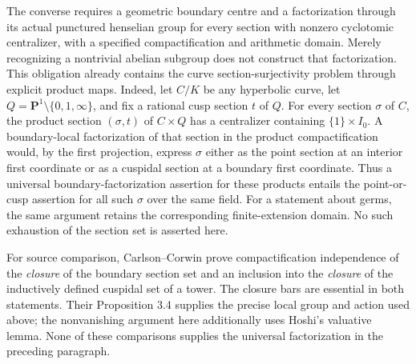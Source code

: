 The converse requires a geometric boundary centre and a factorization
through its actual punctured henselian group for every section with
nonzero cyclotomic centralizer, with a specified compactification and
arithmetic domain. Merely recognizing a nontrivial abelian subgroup
does not construct that factorization. This obligation already contains
the curve section-surjectivity problem through explicit product maps.
Indeed, let $C/K$ be any hyperbolic curve, let $Q=\mathbf
P^1\setminus\{0,1,\infty\}$, and fix a rational cusp section $t$ of
$Q$. For every section $\sigma$ of $C$, the product section
$(\sigma,t)$ of $C\times Q$ has a centralizer containing
$\{1\}\times I_0$. A boundary-local factorization of that section in
the product compactification would, by the first projection, express
$\sigma$ either as the point section at an interior first coordinate
or as a cuspidal section at a boundary first coordinate. Thus a
universal boundary-factorization assertion for these products entails
the point-or-cusp assertion for all such $\sigma$ over the same field.
For a statement about germs, the same argument retains the corresponding
finite-extension domain. No such exhaustion of the section set is
asserted here.

For source comparison, Carlson--Corwin
\cite[Theorem 3.7 and Proposition 4.12]{B_CarlsonCorwin2026} prove
compactification independence of the \emph{closure} of the boundary
section set and an inclusion into the \emph{closure} of the inductively
defined cuspidal set of a tower. The closure bars are essential in both
statements. Their Proposition 3.4 supplies the precise local group and
action used above; the nonvanishing argument here additionally uses
Hoshi's valuative lemma. None of these comparisons supplies the
universal factorization in the preceding paragraph.
